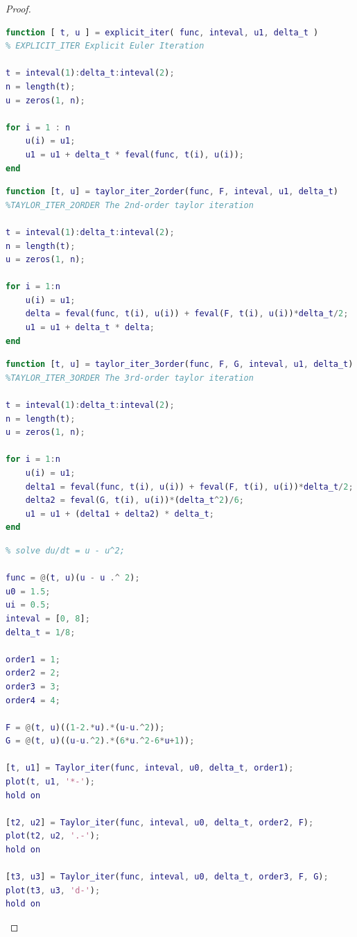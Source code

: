 \documentclass{article}
\begin{document}
\begin{proof}
\begin{lstlisting}[language={MATLAB}]
function [ t, u ] = explicit_iter( func, inteval, u1, delta_t )
% EXPLICIT_ITER Explicit Euler Iteration

t = inteval(1):delta_t:inteval(2);
n = length(t);
u = zeros(1, n);

for i = 1 : n
    u(i) = u1;
    u1 = u1 + delta_t * feval(func, t(i), u(i));
end
\end{lstlisting}

\begin{lstlisting}[language={MATLAB}]
function [t, u] = taylor_iter_2order(func, F, inteval, u1, delta_t)
%TAYLOR_ITER_2ORDER The 2nd-order taylor iteration

t = inteval(1):delta_t:inteval(2);
n = length(t);
u = zeros(1, n);

for i = 1:n
    u(i) = u1;
    delta = feval(func, t(i), u(i)) + feval(F, t(i), u(i))*delta_t/2;
    u1 = u1 + delta_t * delta;
end
\end{lstlisting}

\begin{lstlisting}[language={MATLAB}]
function [t, u] = taylor_iter_3order(func, F, G, inteval, u1, delta_t)
%TAYLOR_ITER_3ORDER The 3rd-order taylor iteration

t = inteval(1):delta_t:inteval(2);
n = length(t);
u = zeros(1, n);

for i = 1:n
    u(i) = u1;
    delta1 = feval(func, t(i), u(i)) + feval(F, t(i), u(i))*delta_t/2;
    delta2 = feval(G, t(i), u(i))*(delta_t^2)/6;
    u1 = u1 + (delta1 + delta2) * delta_t;
end
\end{lstlisting}

\begin{lstlisting}[language={MATLAB}]
% Page 74, Exercise 1
% solve du/dt = u - u^2;

func = @(t, u)(u - u .^ 2);
u0 = 1.5;
ui = 0.5;
inteval = [0, 8];
delta_t = 1/8;

order1 = 1;
order2 = 2;
order3 = 3;
order4 = 4;

F = @(t, u)((1-2.*u).*(u-u.^2));
G = @(t, u)((u-u.^2).*(6*u.^2-6*u+1));

[t, u1] = Taylor_iter(func, inteval, u0, delta_t, order1);
plot(t, u1, '*-');
hold on

[t2, u2] = Taylor_iter(func, inteval, u0, delta_t, order2, F);
plot(t2, u2, '.-');
hold on

[t3, u3] = Taylor_iter(func, inteval, u0, delta_t, order3, F, G);
plot(t3, u3, 'd-');
hold on


\end{lstlisting}
\end{proof}
\end{document}
